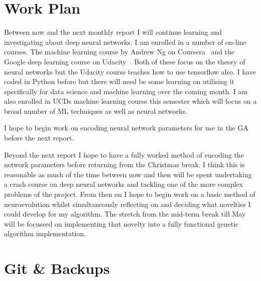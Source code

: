 \documentclass[]{monthly-report}
\begin{document}

\def\studentname{Eoin O'Connell}
\def\projecttitle{Genetic Algorithms for Reducing the Complexity of Deep Neural Networks }
\def\ucdstudentnumber{{13335561}}
\def\monthlyreportnumber{{1}}
\maketitle



\section{Work Plan}

Between now and the next monthly report I will continue learning and investigating about deep neural networks. I am enrolled in a number of on-line courses. The machine learning course by Andrew Ng on Coursera~\cite{Ng-Coursera-2016} and the Google deep learning course on Udacity~\cite{Vanhoucke2017}. Both of these focus on the theory of neural networks but the Udacity course teaches how to use tensorflow also. I have coded in Python before but there will need be some learning on utilising it specifically for data science and machine learning over the coming month. I am also enrolled in UCDs machine learning course this semester which will focus on a broad number of ML techniques as well as neural networks. 

I hope to begin work on encoding neural network parameters for use in the GA before the next report.

Beyond the next report I hope to have a fully worked method of encoding the network parameters before returning from the Christmas break. I think this is reasonable as much of the time between now and then will be spent undertaking a crash course on deep neural networks and tackling one of the more complex problems of the project. From then on I hope to begin work on a basic method of neuroevolution whilst simultaneously reflecting on and deciding what novelties I could develop for my algorithm. The stretch from the mid-term break till May will be focussed on implementing that novelty into a fully functional genetic algorithm implementation. 

\section{Git \& Backups}
\end{document}

